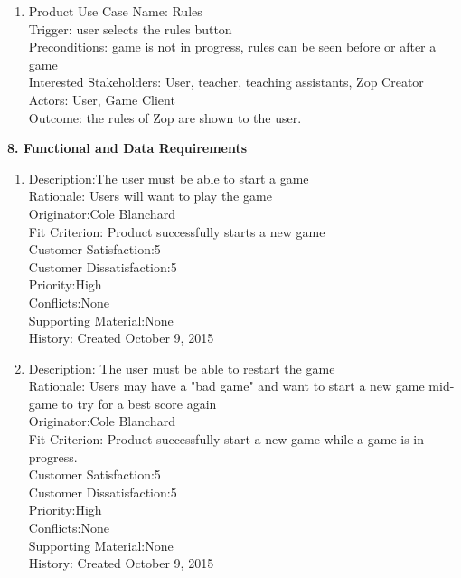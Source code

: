 \documentclass[12pt]{article}
\begin{document}
\begin{enumerate}
 \item Product Use Case Name: Rules\\
 Trigger: user selects the rules button\\
 Preconditions: game is not in progress, rules can be seen before or after a game\\
 Interested Stakeholders: User, teacher, teaching assistants, Zop Creator\\
 Actors: User, Game Client\\
 Outcome: the rules of Zop are shown to the user.\\

\end{enumerate}
\textbf{8. Functional and Data Requirements}
\begin{enumerate}
 
 \item Description:The user must be able to start a game\\
 Rationale: Users will want to play the game\\
 Originator:Cole Blanchard\\
 Fit Criterion: Product successfully starts a new game\\
 Customer Satisfaction:5\\
 Customer Dissatisfaction:5\\
 Priority:High\\
 Conflicts:None\\
 Supporting Material:None\\
 History: Created October 9, 2015\\
 
 \item Description: The user must be able to restart the game\\
 Rationale: Users may have a "bad game" and want to start a new game mid-game to try for a best score again \\
 Originator:Cole Blanchard\\
 Fit Criterion: Product successfully start a new game while a game is in progress.\\
 Customer Satisfaction:5\\
 Customer Dissatisfaction:5\\
 Priority:High\\
 Conflicts:None\\
 Supporting Material:None\\
 History: Created October 9, 2015\\
 

\end{enumerate}
\end{document}
